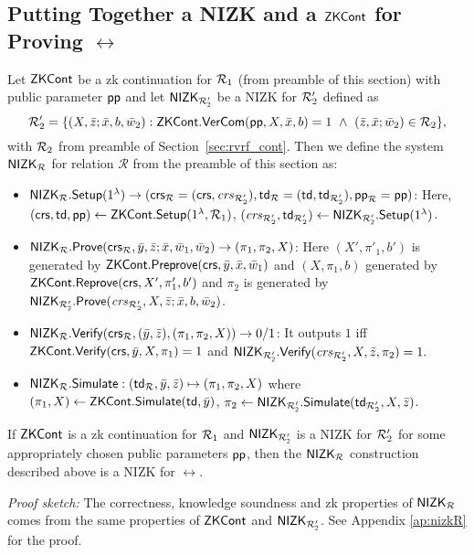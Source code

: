 \subsection{Putting Together a NIZK and a $\ZKCont$  for Proving $\rel$} \label{sec:nizkR}

Let $\ZKCont$ be a zk continuation for $\relone$ (from preamble of this section) with public parameter $ \pp $ and 
let $\nizktwo$ be a NIZK for $\reltwo'$ defined as
$$\reltwo' = \{(X, \barz; \barx, b, \baromega_2): \ZKCont.\VerifyCom(\pp, X, \barx, b) =1\ 
\wedge \ (\barz, \barx; \baromega_2) \in \reltwo \},$$ 
with $\reltwo$ from preamble of Section~\ref{sec:rvrf_cont}. Then we define the system $\nizkR$ for relation $\mathcal{R}$ 
from the preamble of this section as:
\begin{itemize}
\item $\nizkR.\Setup(1^{\lambda})\rightarrow (\crsR = (\crs,\crstwo), \twR = (\tw, \twtwo), \pp_\rel = \pp)$: Here,
$(\crs, \tw, \pp) \leftarrow \ZKCont.\Setup(1^{\lambda}, \relone)$, $(\crstwo, \twtwo) \leftarrow \nizktwo.\Setup(1^{\lambda})$.


\item $\nizkR.\Prove(\crsR,\bary, \barz; \barx, \baromega_1, \baromega_2 ) \rightarrow (\pi_1, \pi_2, X)$: Here 
$(X', \pi'_1, b')$ is generated by $\ZKCont.\Preprove(\crs, \bar{y}, \bar{x}, \baromega_1)$ and 
$(X, \pi_1, b)$ generated by  $\ZKCont.\Reprove(\crs, X', \pi_1', b')$ and $ \pi_2 $ is generated by
$ \nizktwo.\Prove(\crstwo, X, \barz; \barx, b, \baromega_2)$. 

\item $\nizkR.\Verify(\crsR,(\bary, \barz), (\pi_1, \pi_2, X)) \rightarrow 0/1$: It outputs $1$ iff 
$\ZKCont.\Verify(\crs, \bar{y}, X, \pi_1) = 1 $ and $ \nizktwo.\Verify(\crstwo, X, \barz, \pi_2) =1.$

\item $\nizkR.\Sim: (\twR, \bary, \barz) \mapsto (\pi_1, \pi_2, X)$ where 
$(\pi_1, X) \leftarrow \ZKCont.\Sim(\tw, \bary)$, $\pi_2 \leftarrow \nizktwo.\Sim(\twtwo, X, \barz)$.
 \end{itemize}

 
\begin{theorem}
	If $\ZKCont$ is a zk continuation for $\relone$ and $\nizktwo$ is a NIZK for $\reltwo'$ for some appropriately chosen public parameters $\pp$, 
	then the $\nizkR$ construction described above is a NIZK for $\rel$.
\end{theorem}

\textit{Proof sketch:} The correctness, knowledge soundness and zk properties of $ \nizkR $ comes from the same properties of $ \ZKCont $ and $ \nizktwo $. See Appendix \ref{ap:nizkR} for the proof.
